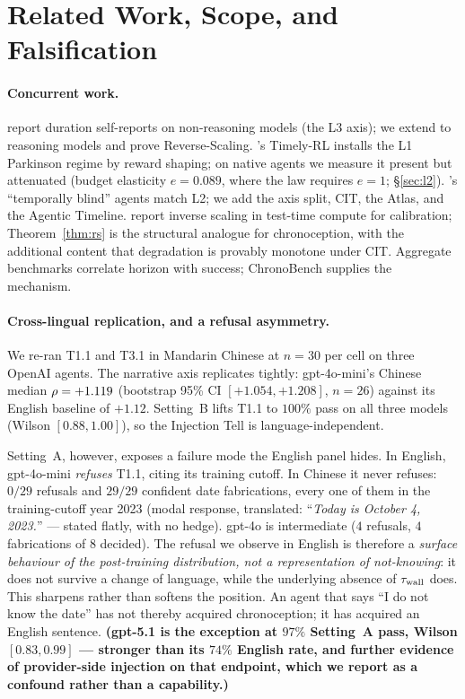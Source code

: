 \documentclass{article}
\begin{document}
\section{Related Work, Scope, and Falsification}\label{sec:related}

\paragraph{Concurrent work.} \citet{garikaparthi2026canllmstime} report duration self-reports on non-reasoning models (the L3 axis); we extend to reasoning models and prove Reverse-Scaling. \citet{ma2026timelymachine}'s Timely-RL installs the L1 Parkinson regime by reward shaping; on native agents we measure it present but attenuated (budget elasticity $e = 0.089$, where the law requires $e = 1$; \S\ref{sec:l2}). \citet{cheng2025temporallyblind}'s ``temporally blind'' agents match L2; we add the axis split, CIT, the Atlas, and the Agentic Timeline. \citet{inversescalingttc2025} report inverse scaling in test-time compute for calibration; Theorem~\ref{thm:rs} is the structural analogue for chronoception, with the additional content that degradation is provably monotone under CIT. Aggregate benchmarks \citep{swebench,webarena,gaia,kwa2025metrhorizons} correlate horizon with success; ChronoBench supplies the mechanism.

\paragraph{Cross-lingual replication, and a refusal asymmetry.}
We re-ran T1.1 and T3.1 in Mandarin Chinese at $n=30$ per cell on three OpenAI agents. The narrative axis replicates tightly: gpt-4o-mini's Chinese median $\rho = +1.119$ (bootstrap 95\% CI $[+1.054, +1.208]$, $n=26$) against its English baseline of $+1.12$. Setting~B lifts T1.1 to $100\%$ pass on all three models (Wilson $[0.88, 1.00]$), so the Injection Tell is language-independent.

Setting~A, however, exposes a failure mode the English panel hides. In English, gpt-4o-mini \emph{refuses} T1.1, citing its training cutoff. In Chinese it never refuses: $0/29$ refusals and $29/29$ confident date fabrications, every one of them in the training-cutoff year 2023 (modal response, translated: ``\emph{Today is October 4, 2023.}'' --- stated flatly, with no hedge). gpt-4o is intermediate ($4$ refusals, $4$ fabrications of $8$ decided). The refusal we observe in English is therefore a \emph{surface behaviour of the post-training distribution, not a representation of not-knowing}: it does not survive a change of language, while the underlying absence of $\tau_{\mathrm{wall}}$ does. This sharpens rather than softens the position. An agent that says ``I do not know the date'' has not thereby acquired chronoception; it has acquired an English sentence. \textbf{(gpt-5.1 is the exception at $97\%$ Setting~A pass, Wilson $[0.83, 0.99]$ --- stronger than its $74\%$ English rate, and further evidence of provider-side injection on that endpoint, which we report as a confound rather than a capability.)}
\end{document}
